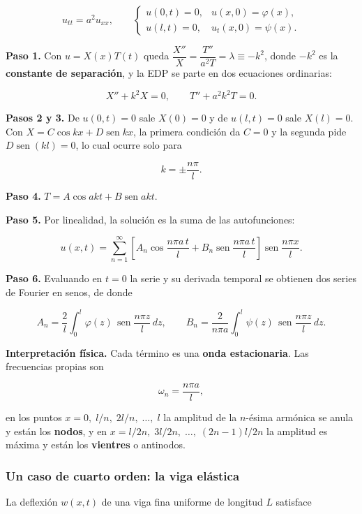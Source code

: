 \documentclass[
  spanish,
  a4paper,
]{scrbook}
\theoremstyle{definition}
\theoremstyle{plain}
\theoremstyle{definition}
\theoremstyle{plain}
\theoremstyle{definition}
\theoremstyle{remark}
\begin{document}
\[
u_{tt} = a^2u_{xx}, \qquad
\begin{cases}
u(0,t) = 0, & u(x,0) = \varphi(x),\\
u(l,t) = 0, & u_t(x,0) = \psi(x).
\end{cases}
\]

\textbf{Paso 1.} Con \(u = X(x)T(t)\) queda
\(\dfrac{X''}{X} = \dfrac{T''}{a^2T} = \lambda \equiv -k^2\), donde
\(-k^2\) es la \textbf{constante de separación}, y la EDP se parte en
dos ecuaciones ordinarias:

\[
X'' + k^2X = 0, \qquad T'' + a^2k^2T = 0 .
\]

\textbf{Pasos 2 y 3.} De \(u(0,t)=0\) sale \(X(0)=0\) y de \(u(l,t)=0\)
sale \(X(l)=0\). Con \(X = C\cos kx + D\operatorname{sen} kx\), la
primera condición da \(C=0\) y la segunda pide
\(D\operatorname{sen}(kl)=0\), lo cual ocurre solo para

\[
k = \pm\frac{n\pi}{l} .
\]

\textbf{Paso 4.} \(T = A\cos akt + B\operatorname{sen} akt\).

\textbf{Paso 5.} Por linealidad, la solución es la suma de las
autofunciones:

\[
u(x,t) = \sum_{n=1}^{\infty}
\left[A_n\cos\frac{n\pi a\,t}{l} + B_n\operatorname{sen}\frac{n\pi a\,t}{l}\right]
\operatorname{sen}\frac{n\pi x}{l} .
\]

\textbf{Paso 6.} Evaluando en \(t=0\) la serie y su derivada temporal se
obtienen dos series de Fourier en senos, de donde

\[
A_n = \frac{2}{l}\int_0^l \varphi(z)\,\operatorname{sen}\frac{n\pi z}{l}\,dz ,
\qquad
B_n = \frac{2}{n\pi a}\int_0^l \psi(z)\,\operatorname{sen}\frac{n\pi z}{l}\,dz .
\]

\textbf{Interpretación física.} Cada término es una \textbf{onda
estacionaria}. Las frecuencias propias son

\[
\omega_n = \frac{n\pi a}{l} ,
\]

en los puntos \(x = 0,\; l/n,\; 2l/n,\;\dots,\;l\) la amplitud de la
\(n\)-ésima armónica se anula y están los \textbf{nodos}, y en
\(x = l/2n,\; 3l/2n,\;\dots,\;(2n-1)l/2n\) la amplitud es máxima y están
los \textbf{vientres} o antinodos.

\subsubsection{Un caso de cuarto orden: la viga
elástica}\label{un-caso-de-cuarto-orden-la-viga-eluxe1stica}

La deflexión \(w(x,t)\) de una viga fina uniforme de longitud \(L\)
satisface
\end{document}
